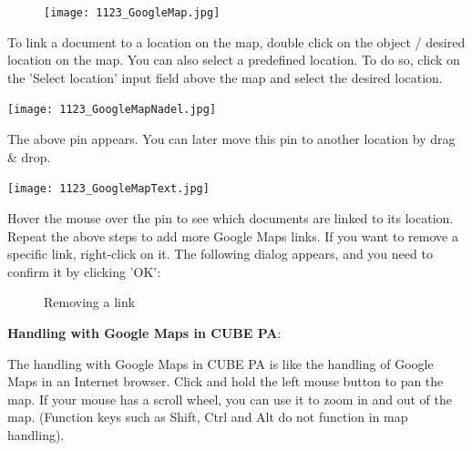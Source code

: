 \vspace{2mm}

\begin{figure}
\vspace{-15pt}
\texttt{[image: 1123\_GoogleMap.jpg]}
\end{figure}

To link a document to a location on the map, double click on the object / desired location on the map. You can also select a predefined location. To do so, click on the 'Select location' input field above the map and select the desired location.

\vspace{4mm}

\hspace{15mm} \texttt{[image: 1123\_GoogleMapNadel.jpg]}

The above pin appears. You can later move this pin to another location by drag \& drop. 

\hspace{15mm} \texttt{[image: 1123\_GoogleMapText.jpg]}

Hover the mouse over the pin to see which documents are linked to its location. \\

Repeat the above steps to add more Google Maps links. If you want to remove a specific link, right-click on it. The following dialog appears, and you need to confirm it by clicking 'OK':

\begin{figure}[H]
\caption{Removing a link}
\end{figure}

\vspace{\baselineskip}
\pagebreak

\textbf{Handling with Google Maps in CUBE PA}:

The handling with Google Maps in CUBE PA is like the handling of Google Maps in an Internet browser. Click and hold the left mouse button to pan the map. If your mouse has a scroll wheel, you can use it to zoom in and out of the map. (Function keys such as Shift, Ctrl and Alt do not function in map handling).

